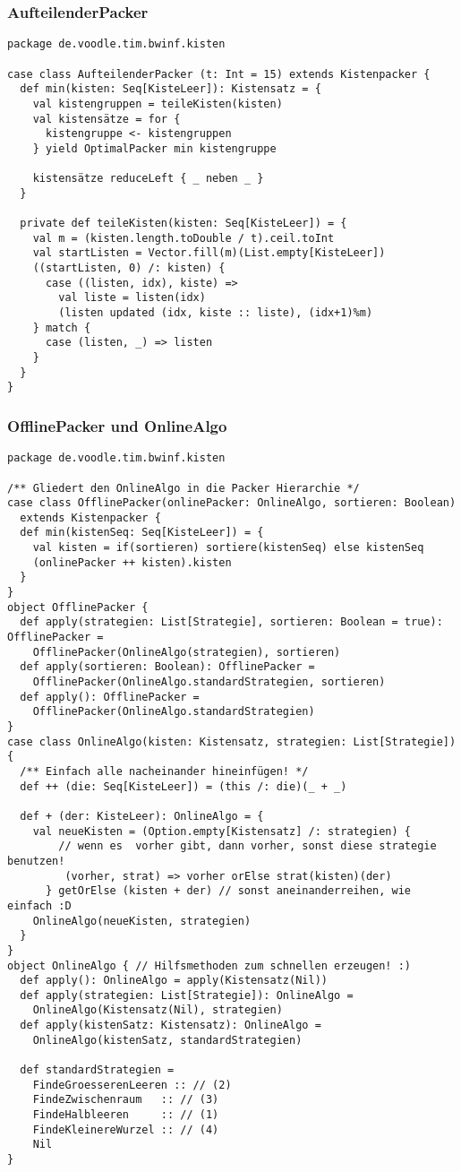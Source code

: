 \subsubsection{AufteilenderPacker}
\begin{lstlisting}
package de.voodle.tim.bwinf.kisten

case class AufteilenderPacker (t: Int = 15) extends Kistenpacker {
  def min(kisten: Seq[KisteLeer]): Kistensatz = {
    val kistengruppen = teileKisten(kisten)
    val kistensätze = for {
      kistengruppe <- kistengruppen
    } yield OptimalPacker min kistengruppe
    
    kistensätze reduceLeft { _ neben _ }
  }

  private def teileKisten(kisten: Seq[KisteLeer]) = {
    val m = (kisten.length.toDouble / t).ceil.toInt
    val startListen = Vector.fill(m)(List.empty[KisteLeer])
    ((startListen, 0) /: kisten) {
      case ((listen, idx), kiste) =>
        val liste = listen(idx)
        (listen updated (idx, kiste :: liste), (idx+1)%m)
    } match {
      case (listen, _) => listen
    }
  }
}
\end{lstlisting}
\clearpage
\subsubsection{OfflinePacker und OnlineAlgo}
\begin{lstlisting}
package de.voodle.tim.bwinf.kisten

/** Gliedert den OnlineAlgo in die Packer Hierarchie */
case class OfflinePacker(onlinePacker: OnlineAlgo, sortieren: Boolean)
  extends Kistenpacker {
  def min(kistenSeq: Seq[KisteLeer]) = {
    val kisten = if(sortieren) sortiere(kistenSeq) else kistenSeq
    (onlinePacker ++ kisten).kisten
  }
}
object OfflinePacker {
  def apply(strategien: List[Strategie], sortieren: Boolean = true): OfflinePacker =
    OfflinePacker(OnlineAlgo(strategien), sortieren)
  def apply(sortieren: Boolean): OfflinePacker =
    OfflinePacker(OnlineAlgo.standardStrategien, sortieren)
  def apply(): OfflinePacker =
    OfflinePacker(OnlineAlgo.standardStrategien)
}
case class OnlineAlgo(kisten: Kistensatz, strategien: List[Strategie]) {
  /** Einfach alle nacheinander hineinfügen! */
  def ++ (die: Seq[KisteLeer]) = (this /: die)(_ + _)

  def + (der: KisteLeer): OnlineAlgo = {
    val neueKisten = (Option.empty[Kistensatz] /: strategien) {
        // wenn es  vorher gibt, dann vorher, sonst diese strategie benutzen!
         (vorher, strat) => vorher orElse strat(kisten)(der)
      } getOrElse (kisten + der) // sonst aneinanderreihen, wie einfach :D
    OnlineAlgo(neueKisten, strategien)
  }
}
object OnlineAlgo { // Hilfsmethoden zum schnellen erzeugen! :)
  def apply(): OnlineAlgo = apply(Kistensatz(Nil))
  def apply(strategien: List[Strategie]): OnlineAlgo =
    OnlineAlgo(Kistensatz(Nil), strategien)
  def apply(kistenSatz: Kistensatz): OnlineAlgo =
    OnlineAlgo(kistenSatz, standardStrategien)

  def standardStrategien =
    FindeGroesserenLeeren :: // (2)
    FindeZwischenraum   :: // (3)
    FindeHalbleeren     :: // (1)
    FindeKleinereWurzel :: // (4)
    Nil
}
\end{lstlisting}

